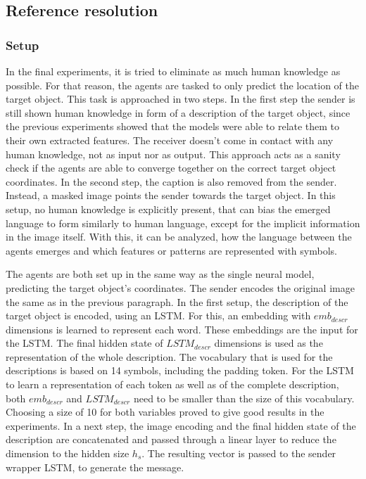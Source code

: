 \subsection{Reference resolution}
\subsubsection*{Setup}
In the final experiments, it is tried to eliminate as much human knowledge as possible.
For that reason, the agents are tasked to only predict the location of the target object.
This task is approached in two steps.
In the first step the sender is still shown human knowledge in form of a description of the target object, since the previous experiments showed that the models were able to relate them to their own extracted features.
The receiver doesn't come in contact with any human knowledge, not as input nor as output.
This approach acts as a sanity check if the agents are able to converge together on the correct target object coordinates.
In the second step, the caption is also removed from the sender.
Instead, a masked image points the sender towards the target object.
In this setup, no human knowledge is explicitly present, that can bias the emerged language to form similarly to human language, except for the implicit information in the image itself.
With this, it can be analyzed, how the language between the agents emerges and which features or patterns are represented with symbols.

The agents are both set up in the same way as the single neural model, predicting the target object's coordinates.
The sender encodes the original image the same as in the previous paragraph.
In the first setup, the description of the target object is encoded, using an LSTM.
For this, an embedding with $emb_{descr}$ dimensions is learned to represent each word.
These embeddings are the input for the LSTM.
The final hidden state of $LSTM_{descr}$ dimensions is used as the representation of the whole description.
The vocabulary that is used for the descriptions is based on 14 symbols, including the padding token.
For the LSTM to learn a representation of each token as well as of the complete description, both $emb_{descr}$ and $LSTM_{descr}$ need to be smaller than the size of this vocabulary.
Choosing a size of 10 for both variables proved to give good results in the experiments.
In a next step, the image encoding and the final hidden state of the description are concatenated and passed through a linear layer to reduce the dimension to the hidden size $h_s$.
The resulting vector is passed to the sender wrapper LSTM, to generate the message.

